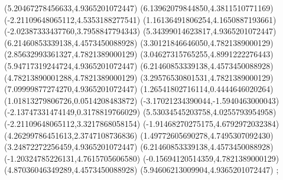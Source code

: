 {(5.20467278456633,4.9365201072447)
(6.13962079844850,4.3811510771169)
(-2.21109648065112,4.5353188277541)
(1.16136491806254,4.1650887193661)
(-2.02387333437760,3.7958847794343)
(5.34399014623817,4.9365201072447)
(6.21460853339138,4.4573450088928)
(3.30121846646050,4.7821389000129)
(2.85632993361327,4.7821389000129)
(3.04627315765255,4.8991222276443)
(5.94717319244724,4.9365201072447)
(6.21460853339138,4.4573450088928)
(4.78213890001288,4.7821389000129)
(3.29576530801531,4.7821389000129)
(7.09999877274270,4.9365201072447)
(1.26541802716114,0.4444646020264)
(1.01813279806726,0.0514208483872)
(-3.17021234390044,-1.5940463000043)
(-2.13747331474149,0.3178819766029)
(5.53034545203758,4.0255793954958)
(-2.21109648065112,3.3217868058154)
(-1.91468270275175,4.6792972032384)
(4.26299786451613,2.3747108736836)
(1.49772605690278,4.7495307092430)
(3.24872272256459,4.9365201072447)
(6.21460853339138,4.4573450088928)
(-1.20324785226131,4.7615705606580)
(-0.15694120514359,4.7821389000129)
(4.87036046349289,4.4573450088928)
(5.94606213009904,4.9365201072447)
};
